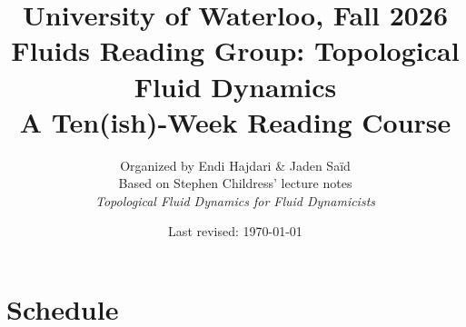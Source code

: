 \documentclass{article}
\title{
    {\large University of Waterloo, Fall 2026}\\[0.4em]
    {\huge\bfseries Fluids Reading Group: Topological Fluid Dynamics}\\[0.4em]
    {\Large A Ten(ish)-Week Reading Course}
}
\author{
    {\large Organized by Endi Hajdari \& Jaden Saïd}\\[1.2em]
    {\normalsize Based on Stephen Childress' lecture notes}\\[0.2em]
    {\normalsize\itshape Topological Fluid Dynamics for Fluid Dynamicists}
}
\date{
    \vspace{0.5cm}
    {\small Last revised: \today}
}
\begin{document}
\maketitle

\section{Schedule}
\end{document}

